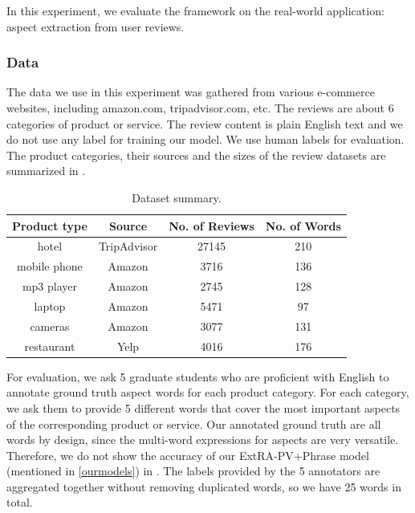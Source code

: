 In this experiment, we evaluate the framework on the real-world application:
aspect extraction from user reviews. 

\subsubsection{Data}

The data we use in this experiment was gathered from various e-commerce 
websites, including amazon.com, tripadvisor.com, etc. 
The reviews are about 6 categories of product or service. 
The review content is plain English text and we do not use any label
for training our model. We use human labels for evaluation. 
The product categories, their sources and the sizes of the review datasets
are summarized in .

\begin{table}[th]
\small
\centering
\caption{Dataset summary.} 
\label{table:dataset}
\begin{tabular}{|c|c|c|c|}
\hline
Product type & Source & No. of Reviews & No. of Words \\ \hline \hline
hotel        & TripAdvisor & 27145   & 210 \\\hline
mobile phone & Amazon & 3716    & 136 \\\hline
mp3 player   & Amazon & 2745    & 128 \\\hline
laptop       & Amazon & 5471    & 97  \\\hline
cameras & Amazon & 3077  & 131 \\\hline
restaurant   & Yelp & 4016    & 176 \\\hline
\end{tabular}
\end{table}


For evaluation, we ask 5 graduate students who are proficient with English 
to annotate ground truth
aspect words for each product category. 
For each category, 
we ask them to provide 5 different words that cover the most important 
aspects of the corresponding product or service. 
Our annotated ground truth are all words by design, 
since the multi-word expressions for aspects  are  very versatile.
Therefore, we do not show the accuracy of our ExtRA-PV+Phrase model (mentioned in \ref{ourmodels}) in .
The labels provided by the 
5 annotators are aggregated together without removing duplicated words, 
so we have 25 words in total. 

